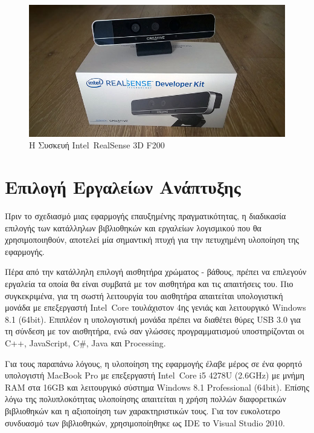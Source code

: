\begin{figure}[H]
    \centering
    \includegraphics[scale=0.35, angle=0]{Files/Figures/RealSenseCamera.jpg}
    \caption[Η Συσκευή Intel\textregistered\ RealSense\texttrademark{} 3D F200]{Η Συσκευή Intel\textregistered\ RealSense\texttrademark{} 3D F200}
    \label{fig:realsense}
\end{figure}



\section{Επιλογή Εργαλείων Ανάπτυξης}


Πριν το σχεδιασμό μιας εφαρμογής επαυξημένης πραγματικότητας, η διαδικασία επιλογής των κατάλληλων βιβλιοθηκών και εργαλείων λογισμικού που θα χρησιμοποιηθούν, αποτελεί μία σημαντική πτυχή για την πετυχημένη υλοποίηση της εφαρμογής. 


Πέρα από την κατάλληλη επιλογή αισθητήρα χρώματος - βάθους,
πρέπει να επιλεγούν εργαλεία τα οποία θα είναι συμβατά με τον αισθητήρα και τις απαιτήσεις του. Πιο συγκεκριμένα, για τη σωστή λειτουργία του αισθητήρα απαιτείται υπολογιστική μονάδα με επεξεργαστή Intel\textregistered\ Core\texttrademark{} τουλάχιστον 4ης γενιάς και λειτουργικό Windows 8.1 (64bit). Επιπλέον η υπολογιστική μονάδα πρέπει να διαθέτει θύρες USB 3.0 για τη σύνδεση με τον αισθητήρα, ενώ σαν γλώσσες προγραμματισμού υποστηρίζονται οι C++, JavaScript, C\#, Java και Processing.


Για τους παραπάνω λόγους, η υλοποίηση της εφαρμογής έλαβε μέρος σε ένα φορητό υπολογιστή  MacBook Pro με επεξεργαστή Intel\textregistered\ Core\texttrademark{} i5 4278U (2.6GHz) με μνήμη RAM στα 16GB και λειτουργικό σύστημα Windows 8.1 Professional (64bit). Επίσης λόγω της πολυπλοκότητας υλοποίησης απαιτείται η χρήση πολλών διαφορετικών βιβλιοθηκών και η αξιοποίηση των χαρακτηριστικών τους. Για τον ευκολοτερο συνδυασμό των βιβλιοθηκών, χρησιμοποίηθηκε ως IDE το Visual Studio 2010.


